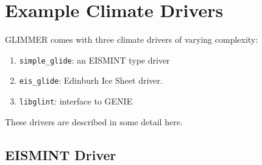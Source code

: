 \section{Example Climate Drivers}
GLIMMER comes with three climate drivers of varying complexity:
\begin{enumerate}
 \item \texttt{simple\_glide}: an EISMINT type driver
 \item \texttt{eis\_glide}: Edinburh Ice Sheet driver.
 \item \texttt{libglint}: interface to GENIE
\end{enumerate}
These drivers are described in some detail here.

\subsection{EISMINT Driver}\label{driver:eismint}
